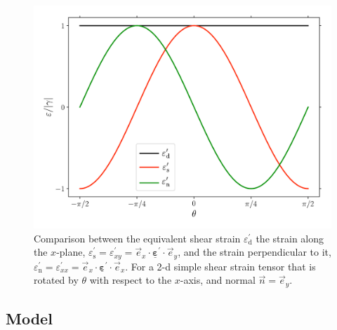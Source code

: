 \documentclass[fleqn, colorlinks]{goose-article}
\newcommand\T[1]{\underline{\bm{{#1}}}}
\begin{document}
\begin{figure}[htp]
    \centering
    \includegraphics[width=.5\textwidth]{figures/strain-modes_2d_epseq}
    \caption{
        Comparison between the equivalent shear strain $\varepsilon_\mathrm{d}^\prime$
        the strain along the $x$-plane,
        $\varepsilon_\mathrm{s}^\prime
        = \varepsilon_{xy}^\prime
        = \vec{e}_x \cdot \T{\varepsilon}^\prime \cdot \vec{e}_y$,
        and the strain perpendicular to it,
        $\varepsilon_\mathrm{n}^\prime
        = \varepsilon_{xx}^\prime
        = \vec{e}_x \cdot \T{\varepsilon}^\prime \cdot \vec{e}_x$.
        For a 2-d simple shear strain tensor that is rotated by $\theta$ with respect
        to the $x$-axis,
        and normal $\vec{n} = \vec{e}_y$.}
    \label{fig:shear-modes:epseq}
\end{figure}

\subsection{Model}
\end{document}
